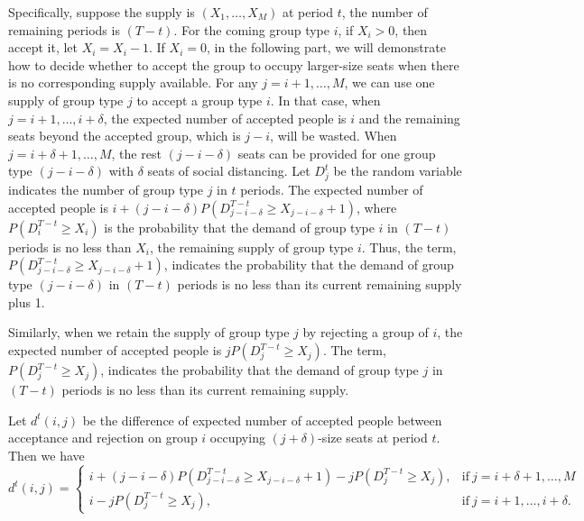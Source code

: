 


Specifically, suppose the supply is $(X_1, \ldots, X_M)$ at period $t$, the number of remaining periods is $(T-t)$. For the coming group type $i$, if $X_i > 0$, then accept it, let $X_i = X_i -1$.
If $X_i = 0$, in the following part, we will demonstrate how to decide whether to accept the group to occupy larger-size seats when there is no corresponding supply available. For any $j=i+1, \ldots, M$, we can use one supply of group type $j$ to accept a group type $i$. In that case, when $j = i+1, \ldots, i+\delta$, the expected number of accepted people is $i$ and the remaining seats beyond the accepted group, which is $j-i$, will be wasted. When $j = i+\delta+1, \ldots, M$, the rest $(j-i-\delta)$ seats can be provided for one group type $(j-i-\delta)$ with $\delta$ seats of social distancing. Let $D_j^{t}$ be the random variable indicates the number of group type $j$ in $t$ periods. The expected number of accepted people is $i + (j-i-\delta)P(D_{j-i-\delta}^{T-t} \geq X_{j-i-\delta}+1)$, where $P(D_i^{T-t} \geq X_i)$ is the probability that the demand of group type $i$ in $(T-t)$ periods is no less than $X_i$, the remaining supply of group type $i$. Thus, the term, $P(D_{j-i-\delta}^{T-t} \geq X_{j-i-\delta}+1)$, indicates the probability that the demand of group type $(j-i-\delta)$ in $(T-t)$ periods is no less than its current remaining supply plus 1. 

Similarly, when we retain the supply of group type $j$ by rejecting a group of $i$, the expected number of accepted people is $j P(D_{j}^{T-t} \geq X_{j})$. The term, $P(D_{j}^{T-t} \geq X_{j})$, indicates the probability that the demand of group type $j$ in $(T-t)$ periods is no less than its current remaining supply.

Let $d^{t}(i,j)$ be the difference of expected number of accepted people between acceptance and rejection on group $i$ occupying $(j+\delta)$-size seats at period $t$. Then we have
\begin{equation*}
	d^{t}(i,j) = \begin{cases}
    i + (j-i-\delta)P(D_{j-i-\delta}^{T-t} \geq X_{j-i-\delta}+1) - j P(D_{j}^{T-t} \geq X_{j}), &\text{if}~ j = i+\delta+1, \ldots, M \\
    i - j P(D_{j}^{T-t} \geq X_{j}), &\text{if}~ j = i+1, \ldots, i+\delta.
		\end{cases}
\end{equation*}

